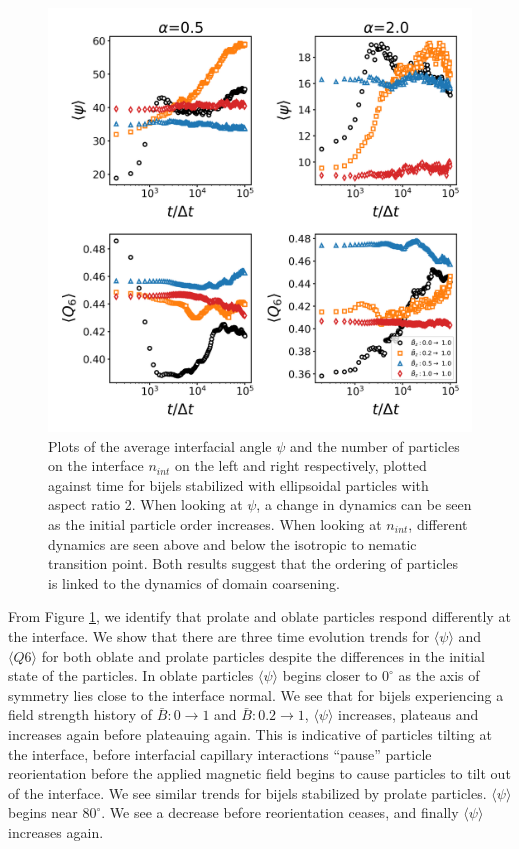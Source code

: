 \begin{figure} 
\centering 
\includegraphics[scale=0.4]{../figures/results/paper2/interface_angle-nint-field_up.png} 
\caption{Plots of the average interfacial angle $\psi$ and the number of particles on the interface $n_{int}$ on the left and right respectively, plotted against time for bijels stabilized with ellipsoidal particles with aspect ratio 2. When looking at $\psi$, a change in dynamics can be seen as the initial particle order increases. When looking at $n_{int}$, different dynamics are seen above and below the isotropic to nematic transition point. Both results suggest that the ordering of particles is linked to the dynamics of domain coarsening.} 
\label{fig:interface_angle-nint-field_up} 
\end{figure}

From Figure \ref{fig:interface_angle-nint-field_up}, we identify that
prolate and oblate particles respond differently at the interface. We
show that there are three time evolution trends for
$\langle \psi \rangle$ and $\langle Q6 \rangle$ for both oblate and
prolate particles despite the differences in the initial state of the
particles. In oblate particles $\langle \psi \rangle$ begins closer to
\(0 ^{\circ}\) as the axis of symmetry lies close to the interface
normal. We see that for bijels experiencing a field strength history of
\(\bar{B}: 0 \rightarrow 1\) and \(\bar{B}: 0.2 \rightarrow 1\),
$\langle \psi \rangle$ increases, plateaus and increases again before
plateauing again. This is indicative of particles tilting at the
interface, before interfacial capillary interactions ``pause'' particle
reorientation before the applied magnetic field begins to cause
particles to tilt out of the interface. We see similar trends for bijels
stabilized by prolate particles. $\langle \psi \rangle$ begins near
\(80 ^{\circ}\). We see a decrease before reorientation ceases, and
finally $\langle \psi \rangle$ increases again.

